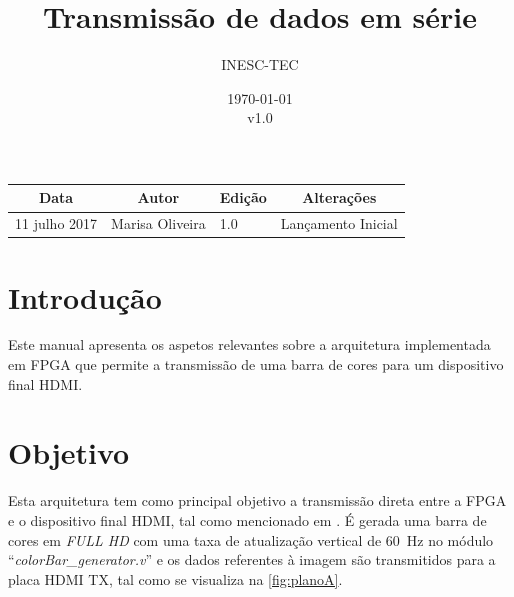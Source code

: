 \documentclass[11pt,a4paper]{article}
\title{Transmissão de dados em série} %
\author{INESC-TEC}
\date{\today \\ v1.0} %
\begin{document}
	
	\maketitle %
	
	\begin{table}[h!]
		\centering
		\label{my-label}
		\begin{tabular}{@{}llll@{}}
			\toprule
			\multicolumn{1}{c}{\textbf{Data}} & \multicolumn{1}{c}{\textbf{Autor}} & \multicolumn{1}{c}{\textbf{Edição}} & \multicolumn{1}{c}{\textbf{Alterações}} \\ \midrule
			11 julho 2017                     & Marisa Oliveira                    & 1.0                                 & Lançamento Inicial                       \\ \bottomrule
		\end{tabular}
	\end{table}
	
	
	
	\section{Introdução}
	
	Este manual apresenta os aspetos relevantes sobre a arquitetura implementada em FPGA que permite a transmissão de uma barra de cores para um dispositivo final HDMI.
	
	\section{Objetivo}
	
	Esta arquitetura tem como principal objetivo a transmissão direta entre a FPGA e o dispositivo final HDMI, tal como mencionado em \cite{R041}. É gerada uma barra de cores em \textit{FULL HD} com uma taxa de atualização vertical de \SI{60}{\hertz} no módulo ``\textit{colorBar\_generator.v}'' e os dados referentes à imagem são transmitidos para a placa HDMI TX, tal como se visualiza na \cref{fig:planoA}.
\end{document}
